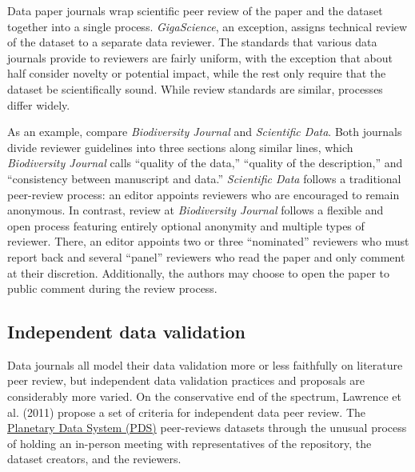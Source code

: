 \documentclass[10pt,a4paper,twocolumn]{article}
\begin{document}
{Data paper journals wrap scientific peer review of the paper and the dataset together into a single process. 
\emph{GigaScience}, an exception, assigns technical review of the dataset to a separate data reviewer.
The standards that various data journals provide to reviewers are fairly uniform, with the exception that about half consider novelty or potential impact, while the rest only require that the dataset be scientifically sound.
While review standards are similar, processes differ widely. 

As an example, compare \emph{Biodiversity Journal} and \emph{Scientific Data}.
Both journals divide reviewer guidelines into three sections along similar lines, which \emph{Biodiversity Journal} calls ``quality of the data,'' ``quality of the description,'' and ``consistency between manuscript and data.''
\emph{Scientific Data} follows a traditional peer-review process: an editor appoints reviewers who are encouraged to remain anonymous.
In contrast, review at \emph{Biodiversity Journal} follows a flexible and open process featuring entirely optional anonymity and multiple types of reviewer.
There, an editor appoints two or three ``nominated'' reviewers who must report back and several ``panel'' reviewers who read the paper and only comment at their discretion.
Additionally, the authors may choose to open the paper to public comment during the review process.

\subsection*{Independent data validation}

Data journals all model their data validation more or less faithfully on literature peer review, but independent data validation practices and proposals are considerably more varied.
On the conservative end of the spectrum, Lawrence et al. (2011) propose a set of criteria for independent data peer review.\cite{lawrence_citation_2011}
The \href{https://pds.jpl.nasa.gov/}{Planetary Data System (PDS)} peer-reviews datasets through the unusual process of holding an in-person meeting with representatives of the repository, the dataset creators, and the reviewers.  

}
\end{document}
